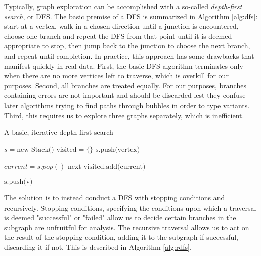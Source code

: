 Typically, graph exploration can be accomplished with a so-called \textit{depth-first search}, or DFS.  The basic premise of a DFS is summarized in Algorithm \ref{alg:dfs}: start at a vertex, walk in a chosen direction until a junction is encountered, choose one branch and repeat the DFS from that point until it is deemed appropriate to stop, then jump back to the junction to choose the next branch, and repeat until completion.  In practice, this approach has some drawbacks that manifest quickly in real data.  First, the basic DFS algorithm terminates only when there are no more vertices left to traverse, which is overkill for our purposes.  Second, all branches are treated equally.  For our purposes, branches containing errors are not important and should be discarded lest they confuse later algorithms trying to find paths through bubbles in order to type variants.  Third, this requires us to explore three graphs separately, which is inefficient.

\begin{algorithm}
\caption{A basic, iterative depth-first search}
\label{alg:dfs}
\begin{algorithmic}[1]
  \State $s = \textrm{new Stack()}$
  \State $\textrm{visited} = \{\}$
  \State $\textrm{s.push(vertex)}$

    \State $current = s.pop()$
        \State $\textrm{next}$
    \EndIf
    \State $\textrm{visited.add(current)}$

        \State $\textrm{s.push(v)}$
    \EndFor
  \EndWhile
\EndFunction
\end{algorithmic}
\end{algorithm}

The solution is to instead conduct a DFS with stopping conditions and recursively.  Stopping conditions, specifying the conditions upon which a traversal is deemed "successful" or "failed" allow us to decide certain branches in the subgraph are unfruitful for analysis.  The recursive traversal allows us to act on the result of the stopping condition, adding it to the subgraph if successful, discarding it if not.  This is described in Algorithm \ref{alg:rdfs}.

